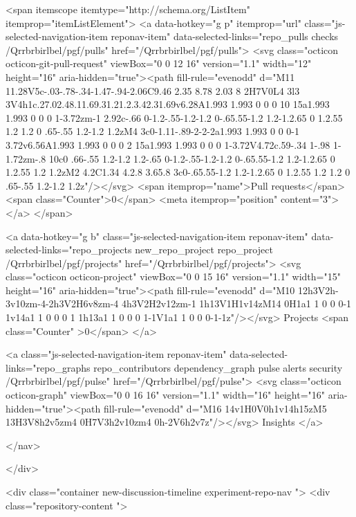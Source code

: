   <span itemscope itemtype="http://schema.org/ListItem" itemprop="itemListElement">
    <a data-hotkey="g p" itemprop="url" class="js-selected-navigation-item reponav-item" data-selected-links="repo_pulls checks /Qrrbrbirlbel/pgf/pulls" href="/Qrrbrbirlbel/pgf/pulls">
      <svg class="octicon octicon-git-pull-request" viewBox="0 0 12 16" version="1.1" width="12" height="16" aria-hidden="true"><path fill-rule="evenodd" d="M11 11.28V5c-.03-.78-.34-1.47-.94-2.06C9.46 2.35 8.78 2.03 8 2H7V0L4 3l3 3V4h1c.27.02.48.11.69.31.21.2.3.42.31.69v6.28A1.993 1.993 0 0 0 10 15a1.993 1.993 0 0 0 1-3.72zm-1 2.92c-.66 0-1.2-.55-1.2-1.2 0-.65.55-1.2 1.2-1.2.65 0 1.2.55 1.2 1.2 0 .65-.55 1.2-1.2 1.2zM4 3c0-1.11-.89-2-2-2a1.993 1.993 0 0 0-1 3.72v6.56A1.993 1.993 0 0 0 2 15a1.993 1.993 0 0 0 1-3.72V4.72c.59-.34 1-.98 1-1.72zm-.8 10c0 .66-.55 1.2-1.2 1.2-.65 0-1.2-.55-1.2-1.2 0-.65.55-1.2 1.2-1.2.65 0 1.2.55 1.2 1.2zM2 4.2C1.34 4.2.8 3.65.8 3c0-.65.55-1.2 1.2-1.2.65 0 1.2.55 1.2 1.2 0 .65-.55 1.2-1.2 1.2z"/></svg>
      <span itemprop="name">Pull requests</span>
      <span class="Counter">0</span>
      <meta itemprop="position" content="3">
</a>  </span>


    <a data-hotkey="g b" class="js-selected-navigation-item reponav-item" data-selected-links="repo_projects new_repo_project repo_project /Qrrbrbirlbel/pgf/projects" href="/Qrrbrbirlbel/pgf/projects">
      <svg class="octicon octicon-project" viewBox="0 0 15 16" version="1.1" width="15" height="16" aria-hidden="true"><path fill-rule="evenodd" d="M10 12h3V2h-3v10zm-4-2h3V2H6v8zm-4 4h3V2H2v12zm-1 1h13V1H1v14zM14 0H1a1 1 0 0 0-1 1v14a1 1 0 0 0 1 1h13a1 1 0 0 0 1-1V1a1 1 0 0 0-1-1z"/></svg>
      Projects
      <span class="Counter" >0</span>
</a>


    <a class="js-selected-navigation-item reponav-item" data-selected-links="repo_graphs repo_contributors dependency_graph pulse alerts security /Qrrbrbirlbel/pgf/pulse" href="/Qrrbrbirlbel/pgf/pulse">
      <svg class="octicon octicon-graph" viewBox="0 0 16 16" version="1.1" width="16" height="16" aria-hidden="true"><path fill-rule="evenodd" d="M16 14v1H0V0h1v14h15zM5 13H3V8h2v5zm4 0H7V3h2v10zm4 0h-2V6h2v7z"/></svg>
      Insights
</a>

</nav>


  </div>

<div class="container new-discussion-timeline experiment-repo-nav  ">
  <div class="repository-content ">

    
    



